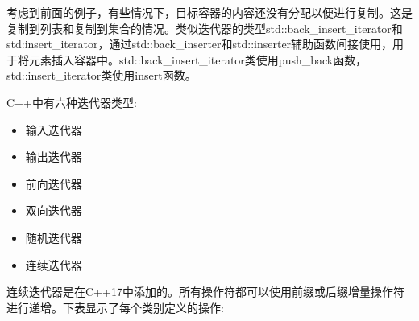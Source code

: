 考虑到前面的例子，有些情况下，目标容器的内容还没有分配以便进行复制。这是复制到列表和复制到集合的情况。类似迭代器的类型std::back\_insert\_iterator和std:insert\_iterator，通过std::back\_inserter和std::inserter辅助函数间接使用，用于将元素插入容器中。std::back\_insert\_iterator类使用push\_back函数，std::insert\_iterator类使用insert函数。

C++中有六种迭代器类型:

\begin{itemize}
\item
输入迭代器

\item
输出迭代器

\item
前向迭代器

\item
双向迭代器

\item
随机迭代器

\item
连续迭代器
\end{itemize}

连续迭代器是在C++17中添加的。所有操作符都可以使用前缀或后缀增量操作符进行递增。下表显示了每个类别定义的操作:

